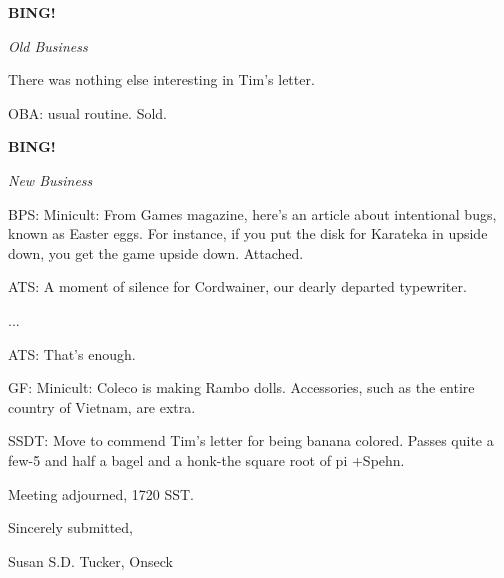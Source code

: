 \documentclass[12pt]{article}
\newcommand{\bing}{{\bf BING!} }
\newcommand{\goto}[1]{\bing \vskip 12pt \centerline{{\em{#1}}}}
\begin{document}
\goto{Old Business}

There was nothing else interesting in Tim's letter.

OBA: usual routine. Sold.

\goto{New Business}

BPS: Minicult: From Games magazine, here's an article about intentional bugs, known as Easter eggs. For instance, if you put the disk for Karateka in upside down, you get the game upside down. Attached.

ATS: A moment of silence for Cordwainer, our dearly departed typewriter.

...

ATS: That's enough.

GF: Minicult: Coleco is making Rambo dolls. Accessories, such as the entire country of Vietnam, are extra.

SSDT: Move to commend Tim's letter for being banana colored. Passes quite a few-5 and half a bagel and a honk-the square root of pi +Spehn.

\vspace{12pt}

\noindent
Meeting adjourned, 1720 SST.

\vspace{18pt}

\centerline{Sincerely submitted,}
\centerline{Susan S.D. Tucker, Onseck}
\end{document}
